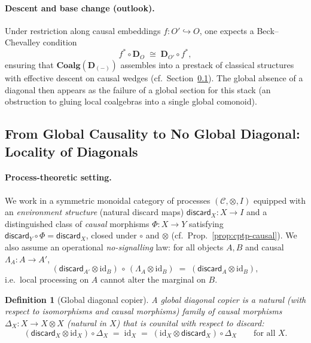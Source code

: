 \documentclass[11pt]{article}
\theoremstyle{upright}
\newtheorem{definition}{Definition}
\begin{document}
\paragraph{Descent and base change (outlook).}
Under restriction along causal embeddings $f:O'\hookrightarrow O$, one expects a Beck--Chevalley condition
\[
f^\ast \circ \mathbf{D}_O \;\cong\; \mathbf{D}_{O'}\circ f^\ast,
\]
ensuring that $\mathbf{Coalg}(\mathbf{D}_{(-)})$ assembles into a prestack of classical structures with effective descent on causal wedges  (cf.\ Section~\ref{sec:causal-nodiag-local}). The global absence of a diagonal then appears as the failure of a global section for this stack (an obstruction to gluing local coalgebras into a single global comonoid).

\subsection{From Global Causality to No Global Diagonal: Locality of Diagonals}
\label{sec:causal-nodiag-local}

\paragraph{Process-theoretic setting.}
We work in a symmetric monoidal category of processes $(\mathcal{C},\otimes,I)$ equipped with an \emph{environment structure} (natural discard maps) $\mathsf{discard}_X:X\to I$ and a distinguished class of \emph{causal} morphisms $\Phi:X\to Y$ satisfying $\mathsf{discard}_Y\!\circ\!\Phi=\mathsf{discard}_X$, closed under $\circ$ and $\otimes$ (cf.\ Prop.~\ref{prop:cptp-causal}). We also assume an operational \emph{no-signalling} law: for all objects $A,B$ and causal $\Lambda_A:A\!\to\!A'$,
\begin{equation}\label{eq:cat-nosig-refined}
(\mathsf{discard}_{A'}\!\otimes\!\mathrm{id}_B)\,\circ\,(\Lambda_A\!\otimes\!\mathrm{id}_B)
\;=\;
(\mathsf{discard}_{A}\!\otimes\!\mathrm{id}_B),
\end{equation}
i.e.\ local processing on $A$ cannot alter the marginal on $B$.

\begin{definition}[Global diagonal copier]
\label{def:global-diagonal-copier}
A \emph{global diagonal copier} is a natural (with respect to isomorphisms and causal morphisms) family of causal morphisms
$\Delta_X:X\to X\otimes X$ (natural in $X$) that is counital with respect to discard:
\begin{equation}\label{eq:counit-laws}
(\mathsf{discard}_X\!\otimes\!\mathrm{id}_X)\circ \Delta_X \;=\; \mathrm{id}_X
\;=\;
(\mathrm{id}_X\!\otimes\!\mathsf{discard}_X)\circ \Delta_X
\qquad\text{for all }X.
\end{equation}
\end{definition}
\end{document}
